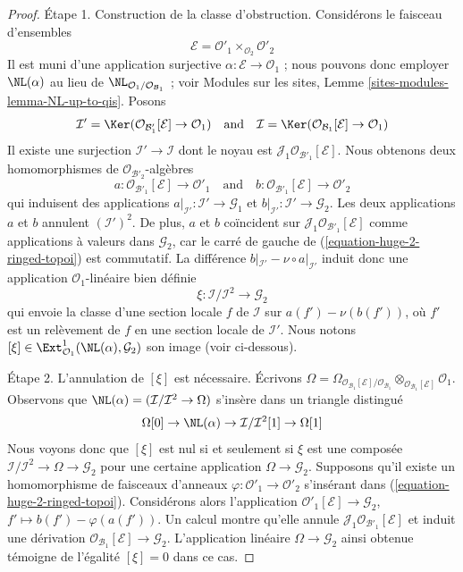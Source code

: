\begin{proof}
\medskip\noindent
Étape 1. Construction de la classe d'obstruction. Considérons le faisceau
d'ensembles
$$
\mathcal{E} = \mathcal{O}'_1 \times_{\mathcal{O}_2} \mathcal{O}'_2
$$
Il est muni d'une application surjective
$\alpha : \mathcal{E} \to \mathcal{O}_1$ ; nous pouvons donc employer
$\NL(\alpha)$ au lieu de
$\NL_{\mathcal{O}_1/\mathcal{O}_{\mathcal{B}_1}}$ ; voir Modules sur les sites,
Lemme \ref{sites-modules-lemma-NL-up-to-qis}.
Posons
$$
\mathcal{I}' =
\Ker(\mathcal{O}_{\mathcal{B}'_1}[\mathcal{E}] \to \mathcal{O}_1)
\quad\text{and}\quad
\mathcal{I} =
\Ker(\mathcal{O}_{\mathcal{B}_1}[\mathcal{E}] \to \mathcal{O}_1)
$$
Il existe une surjection $\mathcal{I}' \to \mathcal{I}$ dont le noyau est
$\mathcal{J}_1\mathcal{O}_{\mathcal{B}'_1}[\mathcal{E}]$.
Nous obtenons deux homomorphismes de $\mathcal{O}_{\mathcal{B}'_2}$-algèbres
$$
a : \mathcal{O}_{\mathcal{B}'_1}[\mathcal{E}] \to \mathcal{O}'_1
\quad\text{and}\quad
b : \mathcal{O}_{\mathcal{B}'_1}[\mathcal{E}] \to \mathcal{O}'_2
$$
qui induisent des applications
$a|_{\mathcal{I}'} : \mathcal{I}' \to \mathcal{G}_1$ et
$b|_{\mathcal{I}'} : \mathcal{I}' \to \mathcal{G}_2$. Les deux applications
$a$ et $b$ annulent $(\mathcal{I}')^2$. De plus, $a$ et $b$ coïncident sur
$\mathcal{J}_1\mathcal{O}_{\mathcal{B}'_1}[\mathcal{E}]$ comme applications
à valeurs dans $\mathcal{G}_2$, car le carré de gauche de
(\ref{equation-huge-2-ringed-topoi}) est commutatif. La différence
$b|_{\mathcal{I}'} - \nu \circ a|_{\mathcal{I}'}$ induit donc une application
$\mathcal{O}_1$-linéaire bien définie
$$
\xi : \mathcal{I}/\mathcal{I}^2 \longrightarrow \mathcal{G}_2
$$
qui envoie la classe d'une section locale $f$ de $\mathcal{I}$ sur
$a(f') - \nu(b(f'))$, où $f'$ est un relèvement de $f$ en une section locale
de $\mathcal{I}'$. Nous notons
$[\xi] \in \Ext^1_{\mathcal{O}_1}(\NL(\alpha), \mathcal{G}_2)$ son image
(voir ci-dessous).

\medskip\noindent
Étape 2. L'annulation de $[\xi]$ est nécessaire. Écrivons
$\Omega =
\Omega_{\mathcal{O}_{\mathcal{B}_1}[\mathcal{E}]/\mathcal{O}_{\mathcal{B}_1}}
\otimes_{\mathcal{O}_{\mathcal{B}_1}[\mathcal{E}]} \mathcal{O}_1$.
Observons que $\NL(\alpha) = (\mathcal{I}/\mathcal{I}^2 \to \Omega)$ s'insère
dans un triangle distingué
$$
\Omega[0] \to
\NL(\alpha) \to
\mathcal{I}/\mathcal{I}^2[1] \to
\Omega[1]
$$
Nous voyons donc que $[\xi]$ est nul si et seulement si $\xi$ est une composée
$\mathcal{I}/\mathcal{I}^2 \to \Omega \to \mathcal{G}_2$ pour une certaine
application $\Omega \to \mathcal{G}_2$.
Supposons qu'il existe un homomorphisme de faisceaux d'anneaux
$\varphi : \mathcal{O}'_1 \to \mathcal{O}'_2$ s'insérant dans
(\ref{equation-huge-2-ringed-topoi}). Considérons alors l'application
$\mathcal{O}'_1[\mathcal{E}] \to \mathcal{G}_2$,
$f' \mapsto b(f') - \varphi(a(f'))$. Un calcul montre qu'elle annule
$\mathcal{J}_1\mathcal{O}_{\mathcal{B}'_1}[\mathcal{E}]$ et induit une
dérivation $\mathcal{O}_{\mathcal{B}_1}[\mathcal{E}] \to \mathcal{G}_2$.
L'application linéaire $\Omega \to \mathcal{G}_2$ ainsi obtenue témoigne de
l'égalité $[\xi] = 0$ dans ce cas.


\end{proof}
